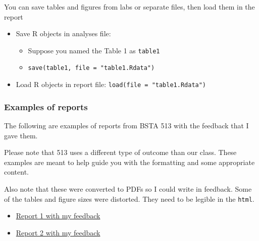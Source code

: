 \documentclass[
  letterpaper,
  DIV=11,
  numbers=noendperiod]{scrartcl}
\providecommand{\tightlist}{%
  \setlength{\itemsep}{0pt}\setlength{\parskip}{0pt}}\usepackage{longtable,booktabs,array}
\begin{document}
\begin{tcolorbox}[enhanced jigsaw, colback=white, bottomrule=.15mm, colframe=quarto-callout-note-color-frame, toptitle=1mm, leftrule=.75mm, arc=.35mm, colbacktitle=quarto-callout-note-color!10!white, coltitle=black, left=2mm, bottomtitle=1mm, titlerule=0mm, breakable, opacitybacktitle=0.6, rightrule=.15mm, toprule=.15mm, title=\textcolor{quarto-callout-note-color}{\faInfo}\hspace{0.5em}{The project report is a separate file from the labs}, opacityback=0]

You can save tables and figures from labs or separate files, then load
them in the report

\begin{itemize}
\tightlist
\item
  Save R objects in analyses file:

  \begin{itemize}
  \tightlist
  \item
    Suppose you named the Table 1 as \texttt{table1}
  \item
    \texttt{save(table1,\ file\ =\ "table1.Rdata")}
  \end{itemize}
\item
  Load R objects in report file: \texttt{load(file\ =\ "table1.Rdata")}
\end{itemize}

\end{tcolorbox}

\subsubsection{Examples of reports}\label{examples-of-reports}

The following are examples of reports from BSTA 513 with the feedback
that I gave them.

Please note that 513 uses a different type of outcome than our class.
These examples are meant to help guide you with the formatting and some
appropriate content.

Also note that these were converted to PDFs so I could write in
feedback. Some of the tables and figure sizes were distorted. They need
to be legible in the \texttt{html}.

\begin{itemize}
\item
  \href{https://ohsuitg-my.sharepoint.com/:b:/r/personal/wakim_ohsu_edu/Documents/Teaching/Classes/W2024_BSTA_512_612/Student_files/Project_examples/Group_09_Report.pdf?csf=1&web=1&e=54lAbD}{Report
  1 with my feedback}
\item
  \href{https://ohsuitg-my.sharepoint.com/:b:/r/personal/wakim_ohsu_edu/Documents/Teaching/Classes/W2024_BSTA_512_612/Student_files/Project_examples/Group_07_Report.pdf?csf=1&web=1&e=uWHgnB}{Report
  2 with my feedback}
\end{itemize}
\end{document}
